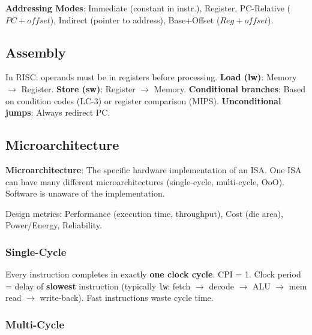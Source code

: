 \begin{definition}
	\textbf{Addressing Modes}: Immediate (constant in instr.), Register, PC-Relative ($PC + offset$), Indirect (pointer to address), Base+Offset ($Reg + offset$).
\end{definition}

\subsection{Assembly}

\begin{important}
	In RISC: operands must be in registers before processing.
	\textbf{Load (lw)}: Memory $\to$ Register. \textbf{Store (sw)}: Register $\to$ Memory.
	\textbf{Conditional branches}: Based on condition codes (LC-3) or register comparison (MIPS).
	\textbf{Unconditional jumps}: Always redirect PC.
\end{important}

\subsection{Microarchitecture}

\begin{definition}
	\textbf{Microarchitecture}: The specific hardware implementation of an ISA. One ISA can have many different microarchitectures (single-cycle, multi-cycle, OoO). Software is unaware of the implementation.
\end{definition}

\begin{remark}
	Design metrics: Performance (execution time, throughput), Cost (die area), Power/Energy, Reliability.
\end{remark}

\subsubsection{Single-Cycle}

\begin{definition}
	Every instruction completes in exactly \textbf{one clock cycle}.
	CPI = 1. Clock period = delay of \textbf{slowest} instruction (typically \texttt{lw}: fetch $\to$ decode $\to$ ALU $\to$ mem read $\to$ write-back). Fast instructions waste cycle time.
\end{definition}

\subsubsection{Multi-Cycle}

